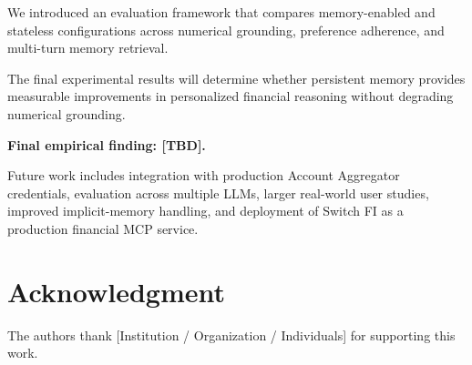 \documentclass[conference]{IEEEtran}
\begin{document}
    We introduced an evaluation framework that compares memory-enabled and
    stateless configurations across numerical grounding, preference
    adherence, and multi-turn memory retrieval.
    
    The final experimental results will determine whether persistent memory
    provides measurable improvements in personalized financial reasoning
    without degrading numerical grounding.
    
    \textbf{Final empirical finding: [TBD].}
    
    Future work includes integration with production Account Aggregator
    credentials, evaluation across multiple LLMs, larger real-world user
    studies, improved implicit-memory handling, and deployment of Switch FI
    as a production financial MCP service.
    
    
    \section*{Acknowledgment}
    
    The authors thank [Institution / Organization / Individuals] for
    supporting this work.
    
    
    
    
    
    
\end{document}
